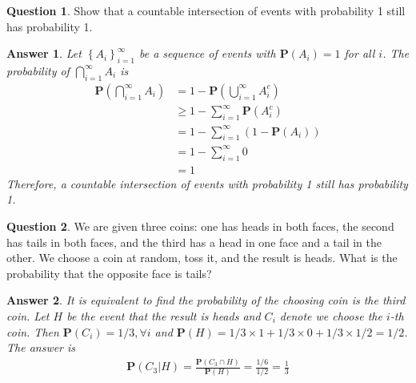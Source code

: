 \documentclass[utf8]{article}
\theoremstyle{definition}%
\newtheorem{question}{Question} %
\theoremstyle{plain}%
\newtheorem{answer}{Answer} %
\begin{document}
\begin{question}
    Show that a countable intersection of events with probability 1 still has probability 1.
\end{question}
\begin{answer}
    Let $\left\{A_i\right\}_{i = 1}^{\infty}$ be a sequence of events with $\mathbf{P}\left(A_i\right) = 1$ for all $i$. The probability of $\bigcap_{i = 1}^{\infty} A_i$ is
    \begin{align*}
        \mathbf{P}\left(\bigcap_{i = 1}^{\infty} A_i\right) &= 1 - \mathbf{P}\left(\bigcup_{i = 1}^{\infty} A_i^c\right) \\
        &\geq 1 - \sum_{i = 1}^{\infty} \mathbf{P}\left(A_i^c\right) \\
        &= 1 - \sum_{i = 1}^{\infty} \left(1 - \mathbf{P}\left(A_i\right)\right) \\
        &= 1 - \sum_{i = 1}^{\infty} 0 \\
        &= 1
    \end{align*}
    Therefore, a countable intersection of events with probability 1 still has probability 1.
\end{answer}

\begin{question}
    We are given three coins: one has heads in both faces, the second has tails in both faces, and the third has a head in one face and a tail in the other. We choose a coin at random, toss it, and the result is heads. What is the probability that the opposite face is tails?
\end{question}
\begin{answer}
    It is equivalent to find the probability of the choosing coin is the third coin. Let $H$ be the event that the result is heads and $C_i$ denote we choose the $i$-th coin. Then $\mathbf{P}\left(C_i\right) = 1/3, \forall i$ and $\mathbf{P}\left(H\right) = 1/3 \times 1 + 1/3 \times 0 + 1/3 \times 1/2 = 1/2$. The answer is 
    \begin{align*}
        \mathbf{P}\left(C_3 | H\right) = \frac{\mathbf{P}\left(C_3 \cap H\right)}{\mathbf{P}\left(H\right)} = \frac{1/6}{1/2} = \frac{1}{3}
    \end{align*}
    
\end{answer}
\end{document}
